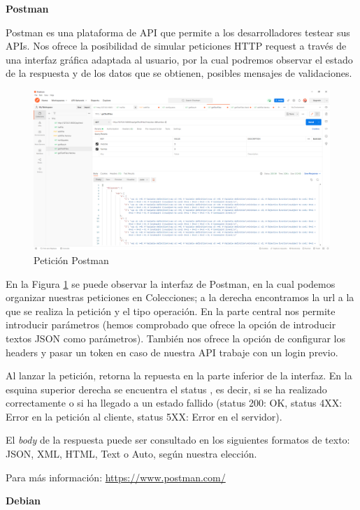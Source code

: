 \textbf{Postman}

Postman es una plataforma de API que permite a los  desarrolladores testear sus APIs. Nos ofrece la posibilidad de simular peticiones HTTP request a través de una interfaz gráfica adaptada al usuario, por la cual podremos observar el estado de la respuesta y de los datos que se obtienen, posibles mensajes de validaciones. 

\begin{figure}[h!] 
\centering
    \includegraphics[width=1\textwidth]{img/postmanRequest.PNG}
\caption{Petición Postman}
\label{fig:request_postman}
\end{figure}

En la Figura \ref{fig:request_postman} se puede observar la interfaz de Postman, en la cual podemos organizar nuestras peticiones en Colecciones; a la derecha encontramos la url a la que se realiza la petición y el tipo operación. En la parte central nos permite introducir parámetros (hemos comprobado que ofrece la opción de introducir textos JSON  como parámetros). También nos ofrece la opción de configurar los headers y pasar un token en caso de nuestra API trabaje con un login previo.

Al lanzar la petición, retorna la repuesta en la parte inferior de la interfaz. En la esquina superior derecha se encuentra el status , es decir, si se ha realizado correctamente o si ha  llegado a un estado fallido (status 200: OK, status 4XX: Error en la petición al cliente, status 5XX: Error en el servidor).

El \textit{body} de la respuesta puede ser consultado en los siguientes formatos de texto: JSON, XML, HTML, Text o Auto, según nuestra elección.

Para más información: \url{https://www.postman.com/}

\textbf{Debian}


